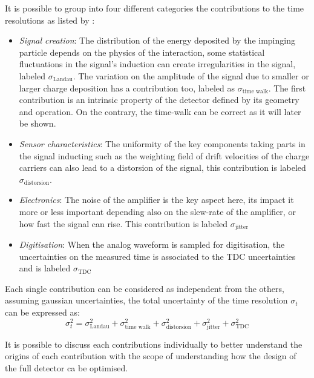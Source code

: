 	It is possible to group into four different categories the contributions to the time resolutions as listed by \cite{timeres_SiliconDetectors}:
	\begin{itemize}
		\item \textit{Signal creation}: The distribution of the energy deposited by the impinging particle depends on the physics of the interaction, some statistical fluctuations in the signal's induction can create irregularities in the signal, labeled $\sigma_{\text{Landau}}$. The variation on the amplitude of the signal due to smaller or larger charge deposition has a contribution too, labeled as $\sigma_{\text{time walk}}$. The first contribution is an intrinsic property of the detector defined by its geometry and operation. On the contrary, the time-walk can be correct as it will later be shown.
		\item \textit{Sensor characteristics}: The uniformity of the key components taking parts in the signal inducting such as the weighting field of drift velocities of the charge carriers can also lead to a distorsion of the signal, this contribution is labeled $\sigma_{\text{distorsion}}$.
		\item \textit{Electronics}: The noise of the amplifier is the key aspect here, its impact it more or less important depending also on the slew-rate of the amplifier, or how fast the signal can rise. This contribution is labeled $\sigma_{\text{jitter}}$
		\item \textit{Digitisation}: When the analog waveform is sampled for digitisation, the uncertainties on the measured time is associated to the TDC uncertainties and is labeled $\sigma_{\text{TDC}}$
	\end{itemize} 
	
	Each single contribution can be considered as independent from the others, assuming gaussian uncertainties, the total uncertainty of the time resolution $\sigma_t$ can be expressed as: 
	\begin{equation}
		\sigma_t^2 = \sigma_{\text{Landau}}^2 + \sigma_{\text{time walk}}^2 + \sigma_{\text{distorsion}}^2 + \sigma_{\text{jitter}}^2 + \sigma_{\text{TDC}}^2
	\end{equation}
	
	It is possible to discuss each contributions individually to better understand the origins of each contribution with the scope of understanding how the design of the full detector ca be optimised. 
